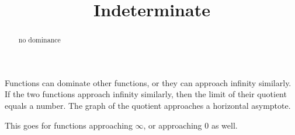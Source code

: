 \documentclass{ximera}
\title{Indeterminate}
\begin{document}
\begin{abstract}
no dominance
\end{abstract}
\maketitle





Functions can dominate other functions, or they can approach infinity similarly.  If the two functions approach infinity similarly, then the limit of their quotient equals a number.  The graph of the quotient approaches a horizontal asymptote. 

This goes for functions approaching $\infty$, or approaching $0$ as well. 
\end{document}
